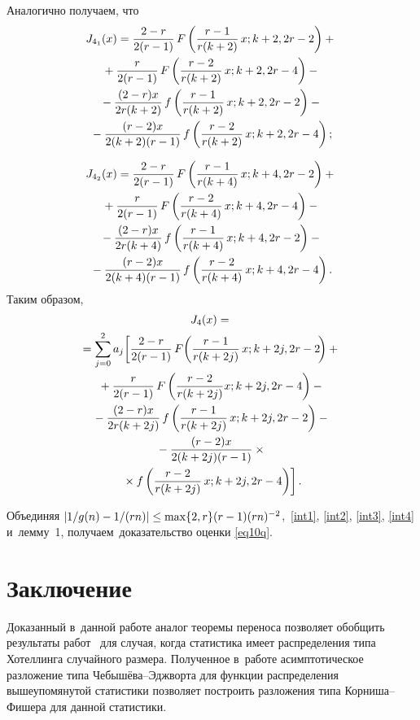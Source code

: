 \begin{multicols}{2}
Аналогично получаем, что
\begin{multline*}
 J_{4_1}(x) =  \fr{2-r}{2(r-1)}\,F\left( \fr{r-1}{r(k+2)}\,x;k+2,2r-2\right) 
+ {}\\
{}+\fr{r}{2(r-1)}\,F\left( \fr{r-2}{r(k+2)} \,x;k+2,2r-4\right) -{}\\
{}-   \fr{(2-r)x}{2r(k+2)} \,f\left( \fr{r-1}{r(k+2)}\, x;k+2,2r-2\right)
 -{}\\
 {}- \fr{(r-2)x}{2(k+2)(r-1)}\,f\left( \fr{r-2}{r(k+2)}\,x;k+2,2r-4\right);
 \end{multline*}
 
 \vspace*{-12pt}
 
 \noindent
 \begin{multline*}
 J_{4_2}(x) =  \fr{2-r}{2(r-1)}\, F\left( \fr{r-1}{r(k+4)}\,x;k+4,2r-2\right) 
+ {}\\
{}+\fr{r}{2(r-1)}\,F\left( \fr{r-2}{r(k+4)}\, x;k+4,2r-4\right) -{}\\
{}-   \fr{(2-r)x}{2r(k+4)} \,f\left( \fr{r-1}{r(k+4)} \,x;k+4,2r-2\right)
 -{}\\
 {}- \fr{(r-2)x}{2(k+4)(r-1)}\,f\left( \fr{r-2}{r(k+4)} \,x;k+4,2r-4\right).
\end{multline*}
Таким образом,
\begin{multline}
 J_{4}(x) ={}\\
 {}= \sum\limits_{j=0}^{2} a_j  \!\left[ \fr{2-r}{2(r-1)} \,F\!\left( \fr{r-
1}{r(k+2j)}\,x;k+2j,2r-2\!\right)+{} \right.{}\hspace*{-0.42361pt}\\
{}+
\fr{r}{2(r-1)}\,F\left( \fr{r-2}{r(k+2j)} x;k+2j,2r-4\right) - {}\\
{}- \fr{(2-r)x}{2r(k+2j)} \,f\left( \fr{r-1}{r(k+2j)}\, x;k+2j,2r-2\right) - 
{}\\
{}-  \fr{(r-2)x}{2(k+2j)(r-1)}\times{}\\
\left.{}\times f\left( \fr{r-2}{r(k+2j)}\,x;k+2j,2r-
4\right) \right].
\label{int4}
\end{multline}

Объединяя $|1/g(n) -1/(r n)| \hm\leq \max\{2 , r\} (r\hm-1) (rn)^{-2} $,~\eqref{int1}, 
\eqref{int2}, \eqref{int3}, \eqref{int4} и~лемму~1, получаем~доказательство оценки \eqref{eq10q}.

\section{Заключение} %

Доказанный в~данной работе аналог теоремы переноса позволяет обобщить результаты 
работ~\cite{MMU16,CMU} для случая, когда статистика имеет распределения типа 
Хотеллинга случайного размера. Полученное в~работе асимптотическое разложение 
типа Че\-бы\-шё\-ва--Эдж\-вор\-та для функции распределения вышеупомянутой статистики 
позволяет построить разложения типа Кор\-ни\-ша--Фи\-ше\-ра для данной статистики.


\end{multicols}
